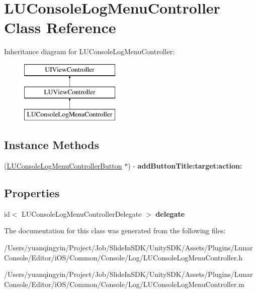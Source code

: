\hypertarget{interface_l_u_console_log_menu_controller}{}\section{L\+U\+Console\+Log\+Menu\+Controller Class Reference}
\label{interface_l_u_console_log_menu_controller}
Inheritance diagram for L\+U\+Console\+Log\+Menu\+Controller\+:\begin{figure}[H]
\begin{center}
\leavevmode
\includegraphics[height=3.000000cm]{interface_l_u_console_log_menu_controller}
\end{center}
\end{figure}
\subsection*{Instance Methods}
\begin{DoxyCompactItemize}
\item 
\mbox{\label{interface_l_u_console_log_menu_controller_af48b909c9818b7f649278be121e78231}} 
(\mbox{\hyperlink{interface_l_u_console_log_menu_controller_button}{L\+U\+Console\+Log\+Menu\+Controller\+Button}} $\ast$) -\/ {\bfseries add\+Button\+Title\+:target\+:action\+:}
\end{DoxyCompactItemize}
\subsection*{Properties}
\begin{DoxyCompactItemize}
\item 
\mbox{\label{interface_l_u_console_log_menu_controller_a76d2e9c50095050b09da46a4275a4a27}} 
id$<$ L\+U\+Console\+Log\+Menu\+Controller\+Delegate $>$ {\bfseries delegate}
\end{DoxyCompactItemize}


The documentation for this class was generated from the following files\+:\begin{DoxyCompactItemize}
\item 
/\+Users/yuanqingyin/\+Project/\+Job/\+Slide\+In\+S\+D\+K/\+Unity\+S\+D\+K/\+Assets/\+Plugins/\+Lunar\+Console/\+Editor/i\+O\+S/\+Common/\+Console/\+Log/L\+U\+Console\+Log\+Menu\+Controller.\+h\item 
/\+Users/yuanqingyin/\+Project/\+Job/\+Slide\+In\+S\+D\+K/\+Unity\+S\+D\+K/\+Assets/\+Plugins/\+Lunar\+Console/\+Editor/i\+O\+S/\+Common/\+Console/\+Log/L\+U\+Console\+Log\+Menu\+Controller.\+m\end{DoxyCompactItemize}

